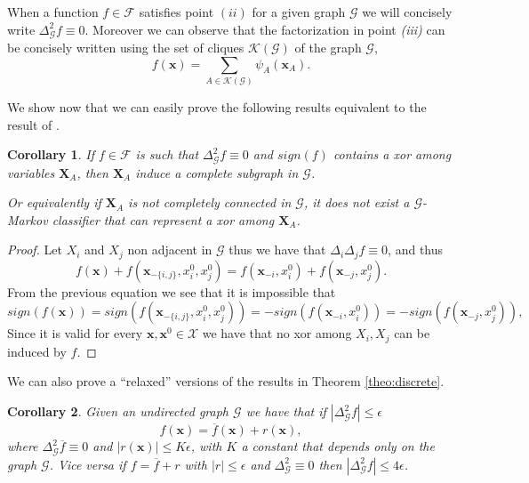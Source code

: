 \documentclass[11pt,a4paper, twoside]{book}
\newtheorem{corollary}{Corollary}[chapter]
\newcommand{\Pp}{\operatorname{P}}
\newcommand{\bx}{\mathbf{x}}
\newcommand{\bX}{\mathbf{X}}
\newcommand{\bchi}{\boldsymbol{\mathcal{X}}}
\begin{document}
When a function $f \in \mathcal{F}$ satisfies point $(ii)$ for a given graph $\mathcal{G}$ we will concisely write $\Delta^{2}_{\mathcal{G}}f\equiv 0$. 
Moreover we can observe that the factorization in point \textit{(iii)} can be concisely written using the set of cliques $\mathcal{K}(\mathcal{G})$ of the graph $\mathcal{G}$,
$$ f(\bx)= \sum_{A \in \mathcal{K}(\mathcal{G})} \psi_A(\bx_A) .$$


We show now that we can easily prove the following results equivalent to the result of \cite{Ling03}.

\begin{corollary}

If $f \in \mathcal{F}$ is such that $\Delta^{2}_{\mathcal{G}}f\equiv 0$ and $sign(f)$ contains a xor among variables $\bX_A$, then $\bX_A$ induce a complete subgraph in $\mathcal{G}$.

Or equivalently if $\bX_A$ is not completely connected in $\mathcal{G}$, it does not exist a $\mathcal{G}$-Markov classifier that can represent a xor among $\bX_A$. 
\end{corollary}
\begin{proof}
Let $X_i$ and $X_j$ non adjacent in $\mathcal{G}$ thus we have that $\Delta_i \Delta_j f \equiv 0$, and thus
$$ f(\bx) + f(\bx_{-\{i,j\}}, x_i^0, x_j^0) = f(\bx_{-i}, x_i^0) + f(\bx_{-j}, x_j^0).$$ 
From the previous equation we see that it is impossible that 
$$sign(f(\bx))=sign(f(\bx_{-\{i,j\}},x^0_i,x^0_j))=-sign(f(\bx_{-i},x^0_i))=-sign(f(\bx_{-j},x^0_j)),$$
Since it is valid for every $\bx, \bx^0 \in \bchi$ we have that no xor among $X_i, X_j$  can be induced by $f$.

\end{proof}


We can also prove a ``relaxed'' versions of the results in Theorem \ref{theo:discrete}. 

\begin{corollary}
\label{prop:epsilon}
Given an undirected graph $\mathcal{G}$ we have that if $|\Delta^{2}_{\mathcal{G}} f| \leq \epsilon$  
$$ f(\mathbf{x}) = \overline{f}(\mathbf{x}) + r(\mathbf{x}),$$
where $\Delta^2_{\mathcal{G}}\overline{f}\equiv 0$  and $|r(\mathbf{x})| \leq K\epsilon $, with $K$ a constant that depends only on the graph $\mathcal{G}$.
 Vice versa if $f = \overline{f} + r$ with $|r| \leq \epsilon$ and $\Delta^{2}_{\mathcal{G}}\equiv 0$ then $|\Delta^2_{\mathcal{G}}f| \leq 4\epsilon$.
\end{corollary}
\end{document}
